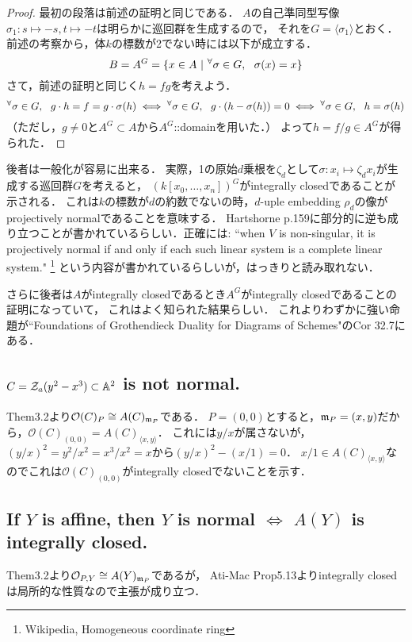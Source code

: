 \documentclass[a4paper]{jarticle}
\begin{document}
    \begin{proof}
        最初の段落は前述の証明と同じである．
        $A$の自己準同型写像$\sigma_1: s \mapsto -s, t \mapsto -t$は明らかに巡回群を生成するので，
        それを$G=\langle \sigma_1 \rangle$とおく．
        前述の考察から，体$k$の標数が2でない時には以下が成立する．
        \[ B=A^G=\{x \in A ~|~ {}^{\forall} \sigma \in G,~~ \sigma(x)=x \} \]
        さて，前述の証明と同じく$h=fg$を考えよう．
        \[
            {}^{\forall} \sigma \in G,~~ g \cdot h=f=g \cdot \sigma(h)
            \iff {}^{\forall} \sigma \in G,~~ g \cdot (h-\sigma(h))=0
            \iff {}^{\forall} \sigma \in G,~~ h=\sigma(h)
        \]
        （ただし，$g \neq 0$と$A^G \subset A$から$A^G$::domainを用いた．）
        よって$h=f/g \in A^G$が得られた．
    \end{proof}
    後者は一般化が容易に出来る．
    実際，1の原始$d$乗根を$\zeta_d$として$\sigma: x_i \mapsto \zeta_d x_i$が生成する巡回群$G$を考えると，
    $(k[x_0,\dots,x_n])^G$がintegrally closedであることが示される．
    これは$k$の標数が$d$の約数でないの時，$d$-uple embedding $\rho_d$の像がprojectively normalであることを意味する．
    Hartshorne p.159に部分的に逆も成り立つことが書かれているらしい．正確には:
    ``when $V$ is non-singular, it is projectively normal if and only if each such linear system is a complete linear system."
    \footnote{Wikipedia, Homogeneous coordinate ring}
    という内容が書かれているらしいが，はっきりと読み取れない．

    さらに後者は$A$がintegrally closedであるとき$A^G$がintegrally closedであることの証明になっていて，
    これはよく知られた結果らしい．
    これよりわずかに強い命題が``Foundations of Grothendieck Duality for Diagrams of Schemes"のCor 32.7にある．

    \subsection{$C=\mathcal{Z}_a(y^2-x^3) \subset \mathbb{A}^2$ is not normal.}
    Them3.2より$\mathcal{O}(C)_P \cong A(C)_{\mathfrak{m}_P}$である．
    $P=(0,0)$とすると，$\mathfrak{m}_P=(x,y)$だから，$\mathcal{O}(C)_{(0,0)}=A(C)_{\langle x,y \rangle}$．
    これには$y/x$が属さないが，$(y/x)^2=y^2/x^2=x^3/x^2=x$から$(y/x)^2-(x/1)=0$．
    $x/1 \in A(C)_{\langle x,y \rangle}$なのでこれは$\mathcal{O}(C)_{(0,0)}$がintegrally closedでないことを示す．

    \subsection{If $Y$ is affine, then $Y$ is normal $\iff$ $A(Y)$ is integrally closed.}
    Them3.2より$\mathcal{O}_{P,Y} \cong A(Y)_{\mathfrak{m}_P}$であるが，
    Ati-Mac Prop5.13よりintegrally closedは局所的な性質なので主張が成り立つ．
\end{document}

